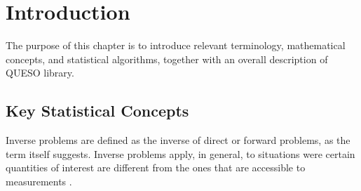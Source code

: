 \chapter{Introduction}\label{ch-introduction}
\thispagestyle{headings}



The purpose of this chapter is to introduce relevant terminology, mathematical concepts, and statistical algorithms, together with an overall description of QUESO library.


\section{Key Statistical Concepts}


Inverse problems are defined as the inverse of direct or forward problems, as the term itself suggests.
Inverse problems apply, in general, to situations were certain quantities of interest are different from the ones that are accessible to measurements \cite{Andersen2001}. 


